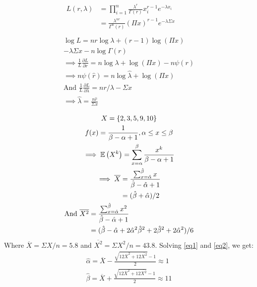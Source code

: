 \documentclass[twocolumn]{article}
\numberwithin{equation}{section}
\begin{document}

\begin{gather}
\begin{aligned}
L(r,\lambda)&=\prod_{i=1}^n\frac{\lambda^r}{\Gamma(r)}x_i^{r-1}e^{-\lambda x_i}\nonumber\\
&=\frac{\lambda^{nr}}{\Gamma^n(r)}(\Pi x)^{r-1}e^{-\lambda\Sigma x}\nonumber\\
\end{aligned}\\
\log L=nr\log\lambda+(r-1)\log(\Pi x)\nonumber\\
-\lambda\Sigma x-n\log\Gamma(r)\nonumber\\
\implies \frac{1}{L}\frac{\partial L}{\partial r}=n\log\lambda+\log(\Pi x)-n\psi(r)\nonumber\\
\implies n\psi(\hat r)=n\log\hat\lambda+\log(\Pi x)\\
\text{And }\frac{1}{L}\frac{\partial L}{\partial \lambda}=nr/\lambda-\Sigma x\nonumber\\
\implies \hat\lambda=\frac{n\hat r}{\Sigma x}
\end{gather}

\newpage

\begin{gather}
X=\{2,3,5,9,10\}\nonumber\\
f(x)=\frac{1}{\beta-\alpha+1},\alpha\le x\le\beta\nonumber\\
\implies \mathbb{E}\left(X^k\right)=\sum_{x=\alpha}^\beta {\frac{x^k}{\beta-\alpha+1}}\nonumber\\
\begin{aligned}
\implies \overline X
&=\frac{\sum_{x=\hat\alpha}^{\hat\beta} x}{\hat\beta-\hat\alpha+1}\\
&=(\hat\beta+\hat\alpha)/2\label{eq1}\\
\end{aligned}\\
\begin{aligned}
\text{And }\overline{X^2}
&=\frac{\sum_{x=\hat\alpha}^{\hat\beta} x^2}{\hat\beta-\hat\alpha+1}\\
&=(\hat\beta-\hat\alpha+2\hat\alpha^2\hat\beta^2+2\hat\beta^2+2\hat\alpha^2)/6\label{eq2}
\end{aligned}
\end{gather}
Where $\overline X=\Sigma X/n=5.8$ and $\overline{X^2}=\Sigma X^2/n=43.8$. Solving \ref{eq1} and \ref{eq2}, we get:\begin{gather*}
\hat\alpha=\overline X-\frac{\sqrt{12\overline{X}^2+12\overline{X^2}}-1}{2}\approx 1\\
\hat\beta=\overline X+\frac{\sqrt{12\overline{X}^2+12\overline{X^2}}-1}{2}\approx 11
\end{gather*}
\end{document}
